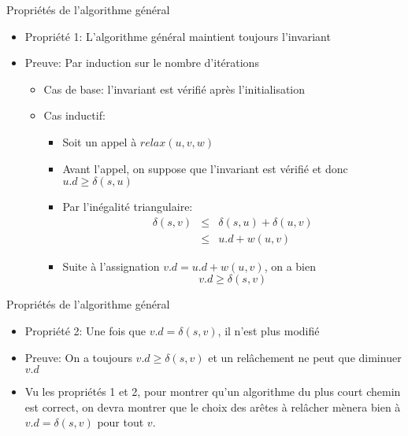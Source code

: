 \begin{frame}{Propriétés de l'algorithme général}

\begin{itemize}
\item \alert{Propriété 1:} L'algorithme général maintient toujours l'invariant

\bigskip

\item \alert{Preuve:} Par induction sur le nombre d'itérations
\begin{itemize}
\item Cas de base: l'invariant est vérifié après l'initialisation
\item Cas inductif:
\begin{itemize}
\item Soit un appel à $relax(u,v,w)$
\item Avant l'appel, on suppose que l'invariant est vérifié et donc $u.d\geq \delta(s,u)$
\item Par l'inégalité triangulaire:
\begin{eqnarray*}
\delta(s,v) &\leq& \delta(s,u)+\delta(u,v)\\
&\leq& u.d+w(u,v)
\end{eqnarray*}
\item Suite à l'assignation $v.d=u.d+w(u,v)$, on a bien $$v.d\geq \delta(s,v)$$
\end{itemize}
\end{itemize}

\end{itemize}
\end{frame}

\bigskip

\begin{frame}{Propriétés de l'algorithme général}

\begin{itemize}
\item \alert{Propriété 2:} Une fois que $v.d=\delta(s,v)$, il n'est plus modifié
\item \alert{Preuve:} On a toujours $v.d\geq \delta(s,v)$ et un relâchement ne peut que diminuer $v.d$

\bigskip

\bigskip

\item Vu les propriétés 1 et 2, pour montrer qu'un algorithme du plus court chemin est
  correct, on devra montrer que le \alert{choix} des arêtes à relâcher
  mènera bien à $v.d=\delta(s,v)$ pour tout $v$.

\end{itemize}

\end{frame}



